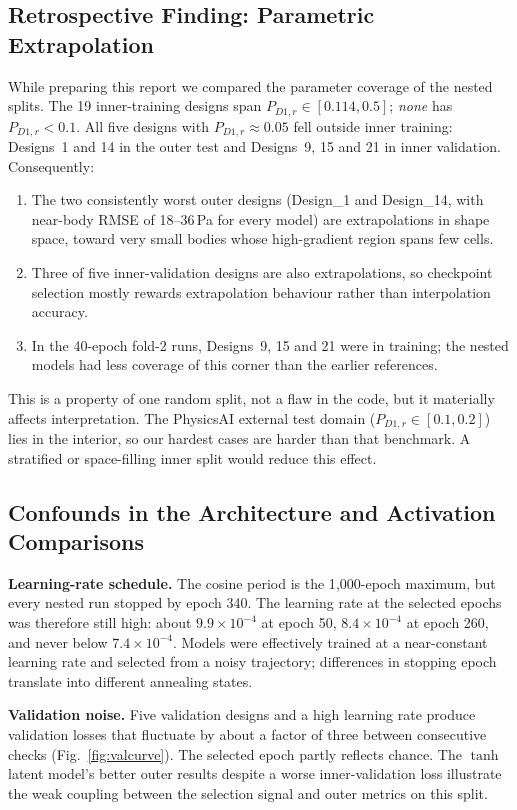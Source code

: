 \documentclass[journal]{IEEEtran}
\newcommand{\pdone}{P_{D1,r}}
\begin{document}
\subsection{Retrospective Finding: Parametric Extrapolation}
\label{sec:extrap}
While preparing this report we compared the parameter coverage of the nested
splits. The 19 inner-training designs span $\pdone\in[0.114,0.5]$; \emph{none}
has $\pdone<0.1$. All five designs with $\pdone\approx0.05$ fell outside
inner training: Designs~1 and 14 in the outer test and Designs~9, 15 and 21 in
inner validation. Consequently:
\begin{enumerate}
\item The two consistently worst outer designs (Design\_1 and Design\_14, with
near-body RMSE of 18--36\,Pa for every model) are extrapolations in shape space,
toward very small bodies whose high-gradient region spans few cells.
\item Three of five inner-validation designs are also extrapolations, so
checkpoint selection mostly rewards extrapolation behaviour rather than
interpolation accuracy.
\item In the 40-epoch fold-2 runs, Designs~9, 15 and 21 were in training; the
nested models had less coverage of this corner than the earlier references.
\end{enumerate}
This is a property of one random split, not a flaw in the code, but it
materially affects interpretation. The PhysicsAI external test domain
($\pdone\in[0.1,0.2]$) lies in the interior, so our hardest cases are harder
than that benchmark. A stratified or space-filling inner split would reduce
this effect.

\subsection{Confounds in the Architecture and Activation Comparisons}
\textbf{Learning-rate schedule.} The cosine period is the 1{,}000-epoch
maximum, but every nested run stopped by epoch 340. The learning rate at the
selected epochs was therefore still high: about $9.9\times10^{-4}$ at epoch 50,
$8.4\times10^{-4}$ at epoch 260, and never below $7.4\times10^{-4}$. Models
were effectively trained at a near-constant learning rate and selected from a
noisy trajectory; differences in stopping epoch translate into different
annealing states.

\textbf{Validation noise.} Five validation designs and a high learning rate
produce validation losses that fluctuate by about a factor of three between
consecutive checks (Fig.~\ref{fig:valcurve}). The selected epoch partly
reflects chance. The $\tanh$ latent model's better outer results despite a worse
inner-validation loss illustrate the weak coupling between the selection
signal and outer metrics on this split.
\end{document}
